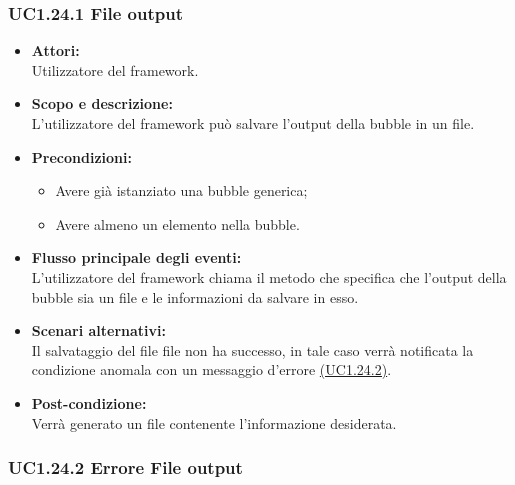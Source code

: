 \subsubsection{UC1.24.1 File output} \label{UC1.24.1}

\begin{itemize}
	\item \textbf{Attori:}
	\\Utilizzatore del framework.
	\item \textbf{Scopo e descrizione:} 
	\\L’utilizzatore del framework può salvare l’output della bubble in un file.
	\item \textbf{Precondizioni:}
	\begin{itemize}
		\item Avere già istanziato una bubble generica;
		\item Avere almeno un elemento nella bubble.
	\end{itemize}
	\item \textbf{Flusso principale degli eventi:}
	\\L’utilizzatore del framework chiama il metodo che specifica che l’output della bubble sia un file e le informazioni da salvare in esso.
	\item \textbf{Scenari alternativi:}
	\\Il salvataggio del file file non ha successo, in tale caso verrà notificata la condizione anomala con un messaggio d’errore \hyperref[UC1.24.2]{(UC1.24.2)}.
	\item \textbf{Post-condizione:}
	\\Verrà generato un file contenente l'informazione desiderata.
\end{itemize}

\subsubsection{UC1.24.2 Errore File output} \label{UC1.24.2}

